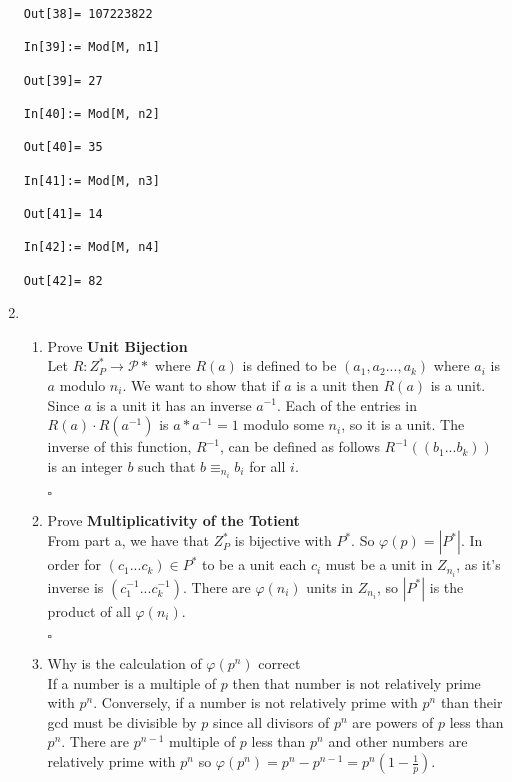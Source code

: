 \documentclass[12pt]{amsart}
\theoremstyle{definition}
\newcommand{\mc}[1]{\mathcal{#1}}
\begin{document}
\begin{enumerate}
\begin{verbatim}
Out[38]= 107223822

In[39]:= Mod[M, n1]

Out[39]= 27

In[40]:= Mod[M, n2]

Out[40]= 35

In[41]:= Mod[M, n3]

Out[41]= 14

In[42]:= Mod[M, n4]

Out[42]= 82
\end{verbatim}


\newpage %
\item 
\begin{enumerate}
\item Prove {\bfseries Unit Bijection}
\\

	Let $R\colon Z_P^*\to \mc{P}*$ where $R(a)$ is defined to be $(a_1,a_2...,a_k)$ where $a_i$ is $a$ modulo $n_i$.  We want to show that if $a$ is a unit then $R(a)$ is a unit. Since $a$ is a unit it has an inverse $a^{-1}$.  Each of the entries in 
	$R(a)\cdot R(a^{-1})$ is $a*a^{-1}=1$ modulo some $n_i$, so it is a unit. 
	The inverse of this function, $R^{-1}$, can be defined as follows $R^{-1}((b_1...b_k))$ is an integer $b$ such that $b \equiv_{n_i} b_i$ for all $i$.
\begin{flushright} $\square$ \end{flushright}
\item Prove {\bfseries Multiplicativity of the Totient}
\\
From part a, we have that $Z_P^*$ is bijective with $P^*$. So $\varphi(p)=|P^*|$. In order for $(c_1...c_k) \in P^*$ to be a unit each $c_i$ must be a unit in $Z_{n_i}$, as it's inverse is $(c^{-1}_1...c^{-1}_k)$. There are $\varphi(n_i)$ units in $Z_{n_i}$, so $|P^*|$ is the product of all $\varphi(n_i)$.
\begin{flushright} $\square$ \end{flushright}
\item Why is the calculation of $\varphi(p^n)$ correct
\\
If a number is a multiple of $p$ then that number is not relatively prime with $p^n$. Conversely, if a number is not relatively prime with $p^n$ than their gcd must be divisible by $p$ since all divisors of $p^n$ are powers of $p$ less than $p^n$. There are $p^{n-1}$ multiple of $p$ less than $p^n$ and other numbers are relatively prime with $p^n$ so $\varphi(p^n)=p^n-p^{n-1}=p^n(1-\frac{1}{p})$.


\end{enumerate}
\end{enumerate}
\end{document}
